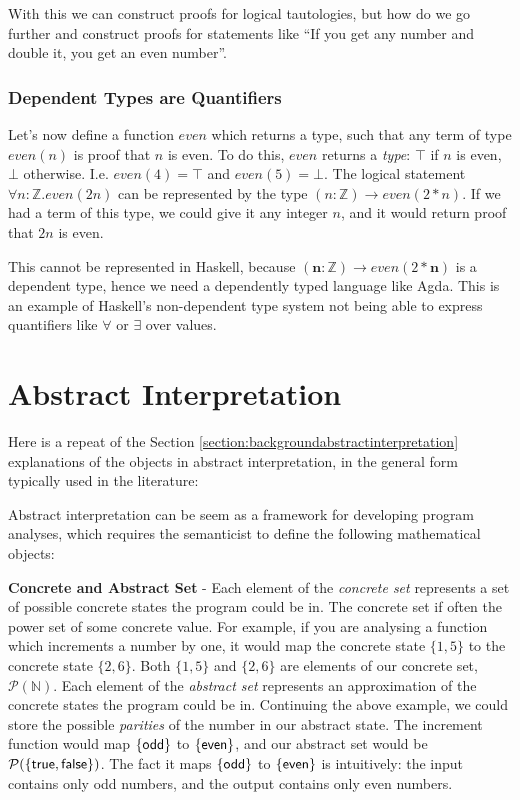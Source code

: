 \documentclass[12pt,twoside]{report}
\begin{document}
With this we can construct proofs for logical tautologies, but how do we go further and construct proofs for statements like ``If you get any number and double it, you get an even number''.

\subsubsection{Dependent Types are Quantifiers}
Let's now define a function $even$ which returns a type, such that any term of type $even(n)$ is proof that $n$ is even. To do this, $even$ returns a \textit{type}: $\top$ if $n$ is even, $\bot$ otherwise. I.e. $even(4) = \top$ and $even(5) = \bot$. The logical statement $\forall n : \mathbb{Z}. even(2n)$ can be represented by the type $(n: \mathbb{Z}) \rightarrow even(2 * n)$. If we had a term of this type, we could give it any integer $n$, and it would return proof that $2n$ is even.

This cannot be represented in Haskell, because $(\textbf{n}: \mathbb{Z}) \rightarrow even(2 * \textbf{n})$ is a dependent type, hence we need a dependently typed language like Agda. This is an example of Haskell's non-dependent type system not being able to express quantifiers like $\forall$ or $\exists$ over values.



\section{Abstract Interpretation}
\label{appendix:backgroundabstractinterpretation}
Here is a repeat of the Section \ref{section:backgroundabstractinterpretation} explanations of the objects in abstract interpretation, in the general form typically used in the literature:

Abstract interpretation can be seem as a framework for developing program analyses, which requires the semanticist to define the following mathematical objects:

\textbf{Concrete and Abstract Set} - Each element of the \textit{concrete set} represents a set of possible concrete states the program could be in. The concrete set if often the power set of some concrete value. For example, if you are analysing a function which increments a number by one, it would map the concrete state $\{1, 5\}$ to the concrete state $\{2, 6\}$. Both $\{1, 5\}$ and $\{2, 6\}$ are  elements of our concrete set, $\mathcal{P}(\mathbb{N})$. Each element of the \textit{abstract set} represents an approximation of the concrete states the program could be in. Continuing the above example, we could store the possible \textit{parities} of the number in our abstract state. The increment function would map $\{ \mathsf{odd} \}$ to $\{ \mathsf{even} \}$, and our abstract set would be $\mathcal{P}({\{ \mathsf{true}, \mathsf{false} \}})$. The fact it maps $\{ \mathsf{odd} \}$ to $\{ \mathsf{even} \}$ is intuitively: the input contains only odd numbers, and the output contains only even numbers.
\end{document}
